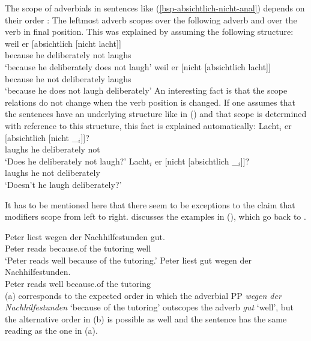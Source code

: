 The scope of adverbials in sentences like (\ref{bsp-absichtlich-nicht-anal}) depends on their order \citep[Section~2.3]{Netter92}:
The leftmost adverb scopes over the following adverb and over the verb in final
position. This was explained by assuming the following structure:
\eal
\label{bsp-absichtlich-nicht-anal}
\ex 
\gll weil er  [absichtlich [nicht lacht]]\\
     because he \hphantom{[}deliberately \hphantom{[}not laughs\\
\glt `because he deliberately does not laugh'
\ex 
\gll weil er [nicht [absichtlich lacht]]\\
     because he \hphantom{[}not \hphantom{[}deliberately laughs\\
\glt `because he does not laugh deliberately'
\zl
\largerpage
An interesting fact is that the scope relations do not change when the verb position is changed. If
one assumes that the sentences have an underlying structure like in () and that scope is
determined with reference to this structure, this fact is explained automatically:
\eal
\label{bsp-absichtlich-nicht-anal-v1}
\ex 
\gll Lacht$_i$ er [absichtlich [nicht \_$_i$]]?\\
     laughs he \hphantom{[}deliberately \hphantom{[}not\\
\glt `Does he deliberately not laugh?'
\ex 
\gll Lacht$_i$ er [nicht [absichtlich \_$_i$]]?\\
     laughs he \hphantom{[}not \hphantom{[}deliberately\\
\glt `Doesn't he laugh deliberately?'
\zl
\nocite{Hoehle88a,Hoehle97a}

\noindent
It has to be mentioned here that there seem to be exceptions to the claim that modifiers scope from
left to right. \citet*[]{Kasper94a} discusses the examples in (), which go back to
\citet*[]{BV72}.

\eal
\label{bsp-peter-liest-gut-wegen}
\ex 
\gll Peter liest wegen der Nachhilfestunden gut.\\
     Peter reads because.of the tutoring well\\
\glt `Peter reads well because of the tutoring.'
\ex 
\gll Peter liest gut wegen der Nachhilfestunden.\\
     Peter reads well because.of the tutoring\\
\zl
(a) corresponds to the expected order in which the adverbial PP \emph{wegen der
  Nachhilfestunden} `because of the tutoring' outscopes the adverb \emph{gut} `well', but the alternative order in (b) is
possible as well and the sentence has the same reading as the one in (a).

